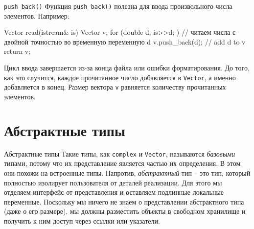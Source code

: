 \documentclass[
    8pt,
    hyperref={pdfencoding=unicode}
    ]{beamer}
\theoremstyle{definition}
\begin{document}
\begin{frame}[fragile]{\texttt{push_back()}}
    Функция \texttt{push_back()} полезна для ввода произвольного числа элементов. Например:
    
    \begin{cppcode}
        Vector read(istream& is)
        {
            Vector v;
            for (double d; is>>d; ) // читаем числа с двойной точностью во временную переменную d
            v.push_back(d); // add d to v
            return v;
        }
    \end{cppcode}
    \vfill
    Цикл ввода завершается из-за конца файла или ошибки форматирования.
    До того, как это случится, каждое прочитанное число добавляется в \texttt{Vector}, а именно 
    добавляется в конец. Размер вектора \texttt{v} равняется количеству прочитанных элементов.    
\end{frame}

\section{Абстрактные типы}
\begin{frame}[fragile]{Абстрактные типы}
    Такие типы, как \texttt{complex} и \texttt{Vector}, называются \emph{базовыми} типами,
    потому что их представление является частью их определения. В этом они похожи на встроенные типы. 
    Напротив, \emph{абстрактный} тип -- это тип, который полностью изолирует пользователя от деталей реализации.
    Для этого мы отделяем интерфейс от представления и оставляем подлинные локальные переменные. 
    Поскольку мы ничего не знаем о представлении абстрактного типа (даже о его размере), мы должны 
    разместить объекты в свободном хранилище и получить к ним доступ через ссылки или указатели.
    
    
\end{frame}
\end{document}
